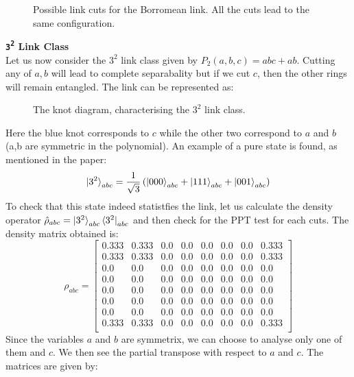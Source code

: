 \documentclass{scrartcl}
\begin{document}
           \begin{figure}[H]
            \centering 
           \scalebox{0.8}{ }
           \caption{Possible link cuts for the Borromean link. All the cuts lead to the same configuration.}
           \end{figure}
           \noindent
            \textbf{\large \texttt{3\textsuperscript{2}} Link Class} \\[0.3cm]
Let us now consider the $3^2$ link class given by $P_2(a,b,c) = abc+ab$. Cutting any of $a,b$ will lead to complete separabality but if we cut $c$, then the other rings will remain entangled. The link can be represented as: 
\begin{figure}[H]
    \centering
    
  \caption{The knot diagram, characterising the $3^2$ link class.}
\end{figure}
\noindent
Here the blue knot corresponds to $c$ while the other two correspond to $a$ and $b$ (a,b are symmetric in the polynomial). An example of a pure state is found, as mentioned in the paper: 
$$\ket{3^2}_{abc} = \frac{1}{\sqrt{3}}\left( \ket{000}_{abc} + \ket{111}_{abc} + \ket{001}_{abc} \right) $$
To check that this state indeed statistfies the link, let us calculate the density operator $\hat{\rho}_{abc}=\ket{3^2}_{abc}\bra{3^2}_{abc}$ and then check for the PPT test for each cuts. 
The density matrix obtained is: 
\begin{equation*}
    \rho_{abc}=
    \left[
    \begin{array}{cccccccc}
    0.333 & 0.333 & 0.0 & 0.0 & 0.0 & 0.0 & 0.0 & 0.333 \\
    0.333 & 0.333 & 0.0 & 0.0 & 0.0 & 0.0 & 0.0 & 0.333 \\
    0.0 & 0.0 & 0.0 & 0.0 & 0.0 & 0.0 & 0.0 & 0.0 \\
    0.0 & 0.0 & 0.0 & 0.0 & 0.0 & 0.0 & 0.0 & 0.0 \\
    0.0 & 0.0 & 0.0 & 0.0 & 0.0 & 0.0 & 0.0 & 0.0 \\
    0.0 & 0.0 & 0.0 & 0.0 & 0.0 & 0.0 & 0.0 & 0.0 \\
    0.0 & 0.0 & 0.0 & 0.0 & 0.0 & 0.0 & 0.0 & 0.0 \\
    0.333 & 0.333 & 0.0 & 0.0 & 0.0 & 0.0 & 0.0 & 0.333 \\
    \end{array}
    \right]
    \end{equation*}
    Since the variables $a$ and $b$ are symmetrix, we can choose to analyse only one of them and $c$. We then see the partial transpose with respect to $a$ and $c$. The matrices are given by:
\end{document}
